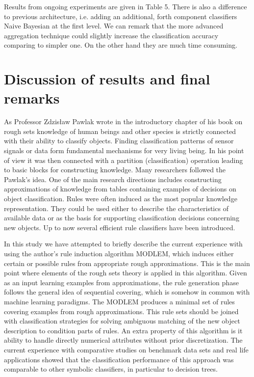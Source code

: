\documentclass{llncs}
\begin{document}
Results from ongoing experiments are given in Table 5. There is also a
difference to previous architecture, i.e. adding an additional, forth
component classifiers Naive Bayesian at the first level. We can remark that
the more advanced  aggregation technique could slightly increase the
classification accuracy comparing to simpler one. On the other hand they are
much time consuming.





\section{Discussion of results and final remarks}

As Professor Zdzis{\l}aw Pawlak wrote in the introductory chapter of his
book on rough sets \cite{pawlak91} knowledge of human beings and other
species is strictly connected with their ability to classify objects.
Finding classification patterns of sensor signals or data form fundamental
mechanisms for very living being. In his point of view it was then connected
with a partition (classification) operation leading to basic blocks for
constructing knowledge. Many researchers followed the Pawlak's idea. One of
the main research directions includes constructing approximations of
knowledge from tables containing examples of
 decisions on object classification. Rules were often induced as the most popular knowledge
representation. They could be used either to describe the characteristics of
available data or as the basis for supporting classification decisions
concerning new objects. Up to now several efficient rule classifiers have
been introduced.


In this study we have attempted to briefly describe the current experience
with using the author's rule induction algorithm MODLEM, which induces
either certain or possible rules from appropriate rough approximations. This
is the main point where elements of the rough sets theory is applied in this
algorithm. Given as an input learning examples from approximations, the rule
generation phase follows the general idea of  sequential covering, which is
somehow in common with machine learning paradigms. The MODLEM produces a
minimal set of rules covering examples from rough approximations. This rule
sets should be joined with classification strategies for solving ambiguous
matching of the new object description to condition parts of rules. An extra
property of this algorithm is it ability to handle directly numerical
attributes without prior discretization. The current experience with
comparative studies on benchmark data sets and real life applications showed
that the classification performance of this approach was comparable to other
symbolic classifiers, in particular to decision trees.
\end{document}

